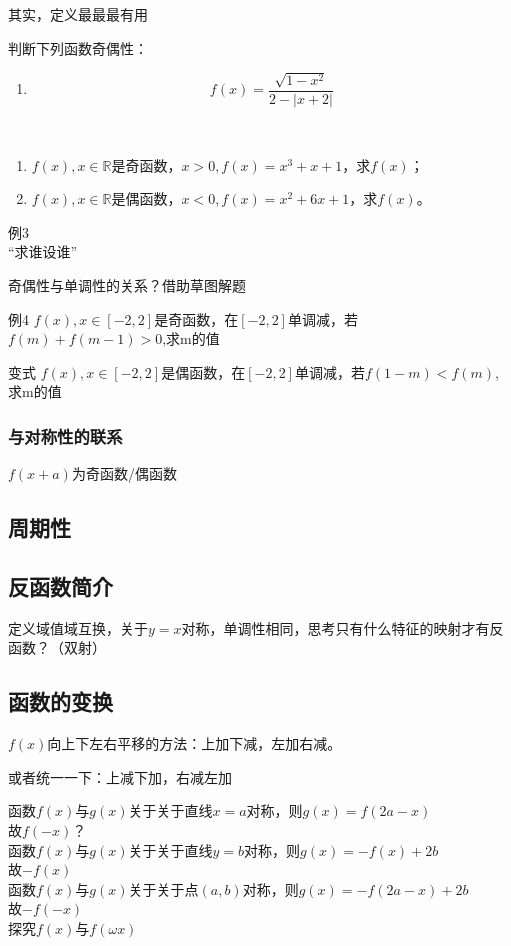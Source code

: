 其实，定义最最最有用
\begin{exercise}判断下列函数奇偶性：
    \begin{enumerate}
        \item \[f(x)=\frac{\sqrt{1-x^2}}{2-|x+2|}\]
    \end{enumerate}
    
\end{exercise}
\begin{example}
    \ 
    
    \begin{enumerate}
        \item $f(x),x\in \mathbb{R}$是奇函数，$x>0,f(x)=x^3+x+1$，求$f(x)$；
        \item $f(x),x\in \mathbb{R}$是偶函数，$x<0,f(x)=x^2+6x+1$，求$f(x)$。
    \end{enumerate}
\end{example}
例3 
\\“求谁设谁”


奇偶性与单调性的关系？借助草图解题

例4 $f(x),x\in [-2,2]$是奇函数，在$[-2,2]$单调减，若$f(m)+f(m-1)>0$,求m的值

变式 $f(x),x\in [-2,2]$是偶函数，在$[-2,2]$单调减，若$f(1-m)<f(m)$,求m的值

\subsubsection*{与对称性的联系}
$f(x+a)$为奇函数/偶函数
\clearpage

\subsection{周期性}
\clearpage



\subsection{反函数简介}
定义域值域互换，关于$y=x$对称，单调性相同，思考只有什么特征的映射才有反函数？（双射）
\subsection{函数的变换}
$f(x)$向上下左右平移的方法：上加下减，左加右减。

或者统一一下：上减下加，右减左加

函数$f(x)$与$g(x)$关于关于直线$x=a$对称，则$g(x)=f(2a-x)$
\\故$f(-x)$？
\\函数$f(x)$与$g(x)$关于关于直线$y=b$对称，则$g(x)=-f(x)+2b$
\\故$-f(x)$
\\函数$f(x)$与$g(x)$关于关于点$(a,b)$对称，则$g(x)=-f(2a-x)+2b$
\\故$-f(-x)$
\\探究$f(x)$与$f(\omega x)$

